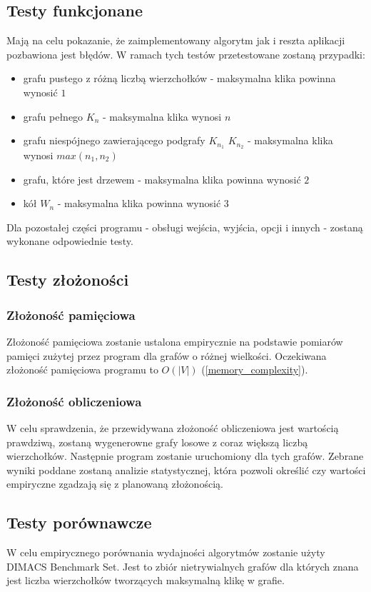 \documentclass[12pt, a4paper]{article}
\begin{document}
\subsection{Testy funkcjonane}
Mają na celu pokazanie, że zaimplementowany algorytm jak i reszta aplikacji pozbawiona jest błędów. W ramach tych testów przetestowane zostaną przypadki:

\begin{itemize}
\item grafu pustego z różną liczbą wierzchołków - maksymalna klika powinna wynosić $1$
\item grafu pełnego $K_{n}$ - maksymalna klika wynosi $n$
\item grafu niespójnego zawierającego podgrafy $K_{n_{1}}$ $K_{n_{2}}$ - maksymalna klika wynosi $max(n_{1}, n_{2})$
\item grafu, które jest drzewem - maksymalna klika powinna wynosić $2$
\item kół $W_{n}$ - maksymalna klika powinna wynosić $3$
\end{itemize}

Dla pozostałej części programu - obsługi wejścia, wyjścia, opcji i innych - zostaną wykonane odpowiednie testy.

\subsection{Testy złożoności}
\subsubsection{Złożoność pamięciowa}
Złożoność pamięciowa zostanie ustalona empirycznie na podstawie pomiarów pamięci zużytej przez program dla grafów o różnej wielkości. Oczekiwana złożoność pamięciowa programu to $O(|V|)$ (\ref{memory_complexity}). 

\subsubsection{Złożoność obliczeniowa}
W celu sprawdzenia, że przewidywana złożoność obliczeniowa jest wartością prawdziwą, zostaną wygenerowne grafy losowe z coraz większą liczbą wierzchołków. Następnie program zostanie uruchomiony dla tych grafów. Zebrane wyniki poddane zostaną analizie statystycznej, która pozwoli określić czy wartości empiryczne zgadzają się z planowaną złożonością.

\subsection{Testy porównawcze}
W celu empirycznego porównania wydajności algorytmów zostanie użyty DIMACS Benchmark Set\citep{dimacs}. Jest to zbiór nietrywialnych grafów dla których znana jest liczba wierzchołków tworzących maksymalną klikę w grafie.


\nocite{*}


\end{document}
